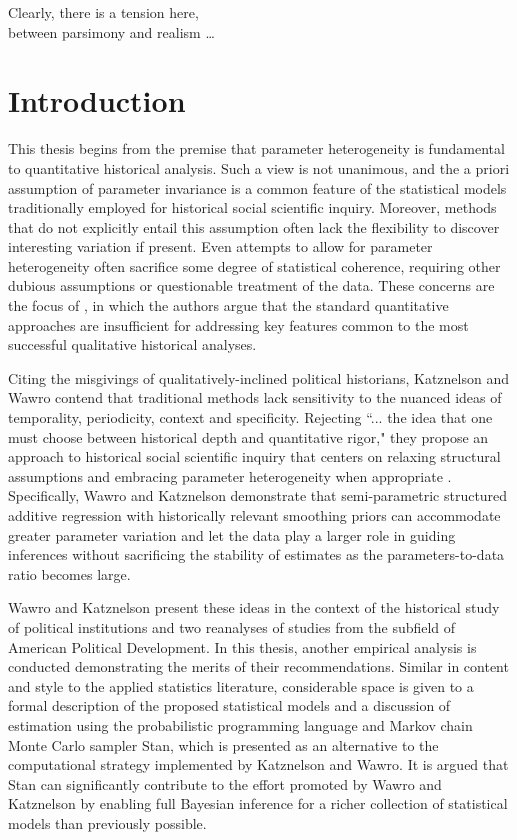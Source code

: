\begin{savequote}[0.4\linewidth]
\singlespacing
\noindent Clearly, there is a tension here, \\ \noindent between parsimony and realism \dots
{}
\end{savequote}

\chapter{Introduction}
\label{introduction}

This thesis begins from the premise that parameter heterogeneity is fundamental to quantitative 
historical analysis. Such a view is not unanimous, and the a priori assumption of 
parameter invariance is a common feature of the statistical models traditionally employed for 
historical social scientific inquiry. Moreover, methods that do not explicitly entail this assumption 
often lack the flexibility to discover interesting variation if present. Even attempts to allow for parameter 
heterogeneity often sacrifice some degree of statistical coherence, requiring other dubious 
assumptions or questionable treatment of the data. 
These concerns are the focus of , in which the authors argue that 
the standard quantitative approaches are insufficient for addressing 
key features common to the most successful qualitative historical analyses. 

Citing the misgivings of qualitatively-inclined political historians, Katznelson and Wawro 
contend that traditional methods lack sensitivity to the nuanced ideas of temporality, periodicity, 
context and specificity. Rejecting 
``... the idea that one must choose between historical depth and quantitative rigor," 
they propose an approach to historical social scientific inquiry that centers on relaxing structural 
assumptions and embracing parameter heterogeneity when appropriate 
. Specifically, 
Wawro and Katznelson demonstrate that semi-parametric structured additive regression 
with historically relevant smoothing priors can accommodate greater parameter variation 
and let the data play a larger role in guiding inferences without sacrificing the stability of 
estimates as the parameters-to-data ratio becomes large.  

Wawro and Katznelson present these ideas in the context of the historical study of political 
institutions and two reanalyses of studies from the subfield of American Political 
Development. In this thesis, another empirical analysis is conducted demonstrating the merits 
of their recommendations. Similar in content and style to the applied statistics literature, 
considerable space is given to a formal description of the proposed statistical models and 
a discussion of estimation using the probabilistic programming 
language and Markov chain Monte Carlo sampler Stan, which is presented as an alternative to 
the computational strategy implemented by Katznelson and Wawro. It is argued that Stan can 
significantly contribute to the effort promoted by Wawro and Katznelson by enabling full Bayesian 
inference for a richer collection of statistical models than previously possible. 
